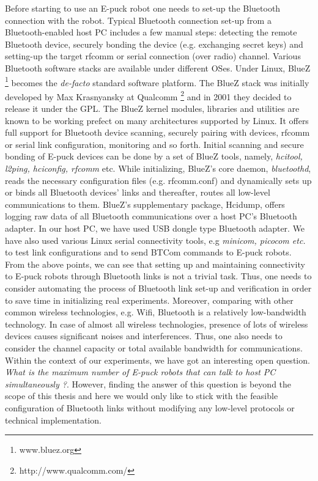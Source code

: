 Before starting to use an E-puck robot  one needs to set-up the Bluetooth connection with the robot. Typical Bluetooth connection set-up from a Bluetooth-enabled host PC includes a few manual steps:  detecting the remote Bluetooth device, securely bonding the device (e.g.  exchanging secret keys) and setting-up the target rfcomm or serial connection (over radio) channel. Various Bluetooth software stacks are available under different OSes. Under Linux, BlueZ \footnote{www.bluez.org} becomes the {\em de-facto} standard software platform. The BlueZ stack was initially developed by Max Krasnyansky at Qualcomm \footnote{http://www.qualcomm.com/} and in 2001  they decided to release it under the GPL. The BlueZ kernel modules, libraries and utilities are known to be working prefect on many architectures supported by Linux. It offers full support for Bluetooth device scanning, securely pairing with devices,  rfcomm or serial link configuration, monitoring and so forth. Initial  scanning and secure bonding of E-puck devices can be done by a set of BlueZ tools, namely, {\em hcitool, l2ping, hciconfig, rfcomm} etc. While initializing, BlueZ's  core daemon, {\em bluetoothd}, reads the necessary configuration files (e.g. rfcomm.conf) and dynamically sets up or binds all Bluetooth devices' links and thereafter, routes all low-level communications to them. BlueZ's supplementary package, Hcidump, offers logging raw data of all Bluetooth communications over a host PC's Bluetooth adapter.  In our host PC, we have used USB dongle type  Bluetooth adapter. We have also used various Linux serial connectivity tools, e.g {\em minicom, picocom etc.} to test link configurations and to send BTCom commands to E-puck robots.\\
From the above points, we can see that setting up and maintaining connectivity to E-puck robots through Bluetooth links is  not a trivial task. Thus, one needs to consider automating the process of Bluetooth link set-up and verification in order to save time in initializing real experiments. Moreover, comparing with other common wireless technologies, e.g. Wifi, Bluetooth is a relatively low-bandwidth technology. In case of almost all wireless technologies, presence of lots of wireless devices  causes significant noises and interferences. Thus, one also needs to consider the channel capacity or total available bandwidth for communications. Within the context of our experiments, we have got an interesting open question. {\em What is the maximum number of E-puck robots that can talk to host PC simultaneously ?}. However, finding the answer of this question is beyond the scope of this thesis and here we would only like  to stick with the feasible configuration of Bluetooth links without modifying any low-level protocols or technical implementation.
